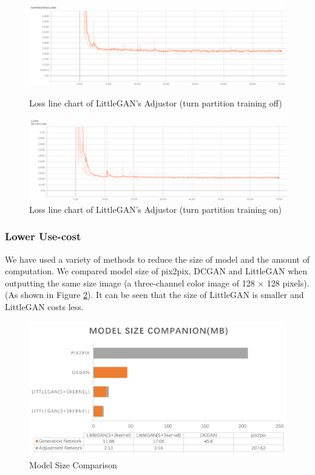 \begin{figure}
    \begin{minipage}[t]{0.49\linewidth}
        \centering
        \includegraphics[width=\textwidth]{figures/loss_part_off_u.png}
        \caption{Loss line chart of LittleGAN's Adjustor (turn partition training off)}
        \label{loss_part_off_u}
    \end{minipage}
        \hfill
    \begin{minipage}[t]{0.49\linewidth}
        \centering
        \includegraphics[width=\textwidth]{figures/loss_part_on_u.png}
        \caption{Loss line chart of LittleGAN's Adjustor (turn partition training on)}
        \label{loss_part_on_u}
    \end{minipage}
\end{figure}


\subsubsection*{Lower Use-cost}
We have used a variety of methods to reduce the size of model and the amount of computation.
We compared model size of pix2pix, DCGAN and LittleGAN when outputting the same size image (a three-channel color image of 128 × 128 pixels).
(As shown in Figure \ref{result_model_size}).
It can be seen that the size of LittleGAN is smaller and LittleGAN costs less.

\begin{figure}
    \begin{center}
    \includegraphics[width=\textwidth]{figures/result_model_size.png}
    \caption{Model Size Comparison}
    \label{result_model_size}
    \end{center}
\end{figure}